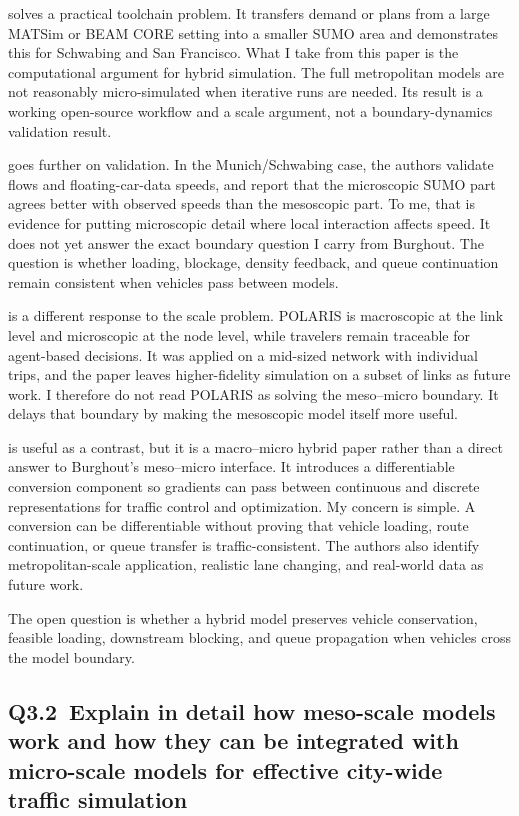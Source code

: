 \begin{bibunit}[plainnat]
\citet{schweizer2024hybridpy} solves a practical toolchain problem. It transfers demand or plans from a large MATSim or BEAM CORE setting into a smaller SUMO area and demonstrates this for Schwabing and San Francisco. What I take from this paper is the computational argument for hybrid simulation. The full metropolitan models are not reasonably micro-simulated when iterative runs are needed. Its result is a working open-source workflow and a scale argument, not a boundary-dynamics validation result.

\citet{schuhmann2025hybrid} goes further on validation. In the Munich/Schwabing case, the authors validate flows and floating-car-data speeds, and report that the microscopic SUMO part agrees better with observed speeds than the mesoscopic part. To me, that is evidence for putting microscopic detail where local interaction affects speed. It does not yet answer the exact boundary question I carry from Burghout. The question is whether loading, blockage, density feedback, and queue continuation remain consistent when vehicles pass between models.

\citet{desouza2019mesoscopic} is a different response to the scale problem. POLARIS is macroscopic at the link level and microscopic at the node level, while travelers remain traceable for agent-based decisions. It was applied on a mid-sized network with individual trips, and the paper leaves higher-fidelity simulation on a subset of links as future work. I therefore do not read POLARIS as solving the meso--micro boundary. It delays that boundary by making the mesoscopic model itself more useful.

\citet{son2022differentiable} is useful as a contrast, but it is a macro--micro hybrid paper rather than a direct answer to Burghout's meso--micro interface. It introduces a differentiable conversion component so gradients can pass between continuous and discrete representations for traffic control and optimization. My concern is simple. A conversion can be differentiable without proving that vehicle loading, route continuation, or queue transfer is traffic-consistent. The authors also identify metropolitan-scale application, realistic lane changing, and real-world data as future work.

The open question is whether a hybrid model preserves vehicle conservation,
feasible loading, downstream blocking, and queue propagation when vehicles
cross the model boundary.

\subsection{Q3.2\ Explain in detail how meso-scale models work and how they can be integrated with micro-scale models for effective city-wide traffic simulation}


\end{bibunit}
